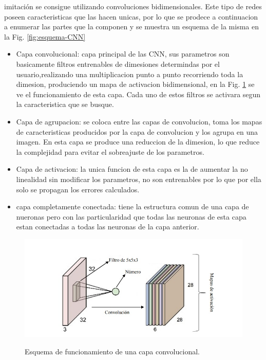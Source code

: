 imitación se consigue utilizando convoluciones bidimensionales. Este tipo de redes poseen caracteristicas que las hacen unicas, por lo que 
se prodece a continuacion a enumerar las partes que la componen y se muestra un esquema de la misma en la Fig. \ref*{fig:esquema-CNN}
\begin{itemize}
    \item Capa convolucional: capa principal de las CNN, sus parametros son basicamente filtros entrenables de dimesiones determindas por el 
    usuario,realizando una multiplicacion punto a punto recorriendo toda la dimesion, produciendo un mapa de activacion bidimensional, en la 
    Fig. \ref{fig:esquema-capa-convolucional} se ve el funcionamiento de esta capa. Cada uno de estos filtros se activara segun la 
    caracteristica que se busque.
    \item Capa de agrupacion: se coloca entre las capas de convolucion, toma los mapas de caracteristicas producidos por la capa de 
    convolucion y los agrupa en una imagen. En esta capa se produce una reduccion de la dimesion, lo que reduce la complejidad para evitar el sobreajuste de los parametros.
    \item Capa de activacion: la unica funcion de esta capa es la de aumentar la no linealidad sin modificar los parametros, no son entrenables 
    por lo que por ella solo se propagan los errores calculados.
    \item capa completamente conectada: tiene la estructura comun de una capa de nueronas pero con las particularidad que todas las neuronas 
    de esta capa estan conectadas a todas las neuronas de la capa anterior.
\end{itemize}
\begin{figure}
    \centering
    \includegraphics[width=1\textwidth]{imgs/capa-convolucional.jpeg}
    \label{fig:esquema-capa-convolucional}
    \caption{Esquema de funcionamiento de una capa convolucional.}
\end{figure}
